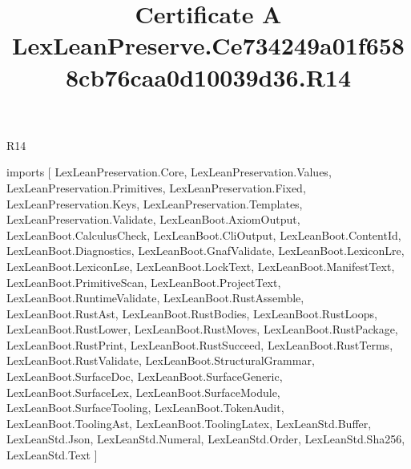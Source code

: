 \begin{lexlean}{R14}
\title{Certificate A LexLeanPreserve.Ce734249a01f6588cb76caa0d10039d36.R14}
\begin{coremodule}
imports [
  LexLeanPreservation.Core,
  LexLeanPreservation.Values,
  LexLeanPreservation.Primitives,
  LexLeanPreservation.Fixed,
  LexLeanPreservation.Keys,
  LexLeanPreservation.Templates,
  LexLeanPreservation.Validate,
  LexLeanBoot.AxiomOutput,
  LexLeanBoot.CalculusCheck,
  LexLeanBoot.CliOutput,
  LexLeanBoot.ContentId,
  LexLeanBoot.Diagnostics,
  LexLeanBoot.GnafValidate,
  LexLeanBoot.LexiconLre,
  LexLeanBoot.LexiconLse,
  LexLeanBoot.LockText,
  LexLeanBoot.ManifestText,
  LexLeanBoot.PrimitiveScan,
  LexLeanBoot.ProjectText,
  LexLeanBoot.RuntimeValidate,
  LexLeanBoot.RustAssemble,
  LexLeanBoot.RustAst,
  LexLeanBoot.RustBodies,
  LexLeanBoot.RustLoops,
  LexLeanBoot.RustLower,
  LexLeanBoot.RustMoves,
  LexLeanBoot.RustPackage,
  LexLeanBoot.RustPrint,
  LexLeanBoot.RustSucceed,
  LexLeanBoot.RustTerms,
  LexLeanBoot.RustValidate,
  LexLeanBoot.StructuralGrammar,
  LexLeanBoot.SurfaceDoc,
  LexLeanBoot.SurfaceGeneric,
  LexLeanBoot.SurfaceLex,
  LexLeanBoot.SurfaceModule,
  LexLeanBoot.SurfaceTooling,
  LexLeanBoot.TokenAudit,
  LexLeanBoot.ToolingAst,
  LexLeanBoot.ToolingLatex,
  LexLeanStd.Buffer,
  LexLeanStd.Json,
  LexLeanStd.Numeral,
  LexLeanStd.Order,
  LexLeanStd.Sha256,
  LexLeanStd.Text
]


\end{coremodule}
\end{lexlean}
